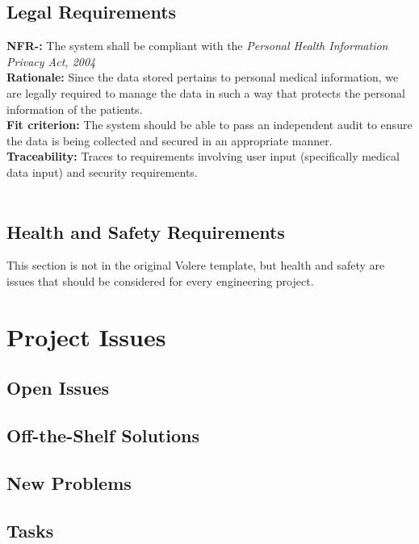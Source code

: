 \documentclass[12pt, titlepage]{article}
\newcounter{NFR_Counter}
\newcounter{FR_Counter}
\begin{document}
\subsection{Legal Requirements}
\noindent\textbf{NFR-\the\value{NFR_Counter}:}
The system shall be compliant with the \textit{Personal Health Information Privacy Act, 2004}  \\
\textbf{Rationale:}
Since the data stored pertains to personal medical information, we are legally required to manage the data in such a way that protects the personal information of the patients. \\
\textbf{Fit criterion:}
The system should be able to pass an independent audit to ensure the data is being collected and secured in an appropriate manner. \\
\textbf{Traceability:}
Traces to requirements involving user input (specifically medical data input) and security requirements. \\~\\
\addtocounter{NFR_Counter}{1}

\subsection{Health and Safety Requirements}

This section is not in the original Volere template, but health and safety are
issues that should be considered for every engineering project.

\section{Project Issues}

\subsection{Open Issues}

\subsection{Off-the-Shelf Solutions}

\subsection{New Problems}

\subsection{Tasks}
\end{document}
